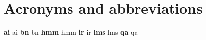 \appendix
\chapter{Acronyms and abbreviations}
\label{appendix:acronyms}
\textbf{\gls{ai}} \glsdesc{ai} 
\vspace{0.5em}\newline
\textbf{\gls{bn}} \glsdesc{bn} 
\vspace{0.5em}\newline
\textbf{\gls{hmm}} \glsdesc{hmm} 
\vspace{0.5em}\newline
\textbf{\acrshort{ir}} \glsdesc{ir} 
\vspace{0.5em}\newline
\textbf{\gls{lms}} \glsdesc{lms} 
\vspace{0.5em}\newline
\textbf{\acrshort{qa}} \glsdesc{qa} 

\printindex
\printglossaries